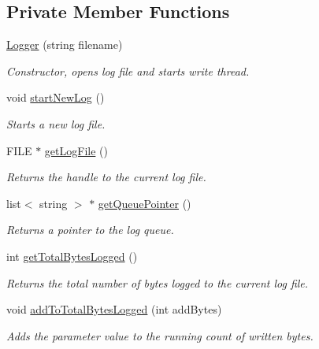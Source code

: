 \subsection*{Private Member Functions}
\begin{DoxyCompactItemize}
\item 
\hyperlink{class_logger_a08ccb1b46d6ffef44052d289ecb4b04b}{Logger} (string filename)
\begin{DoxyCompactList}\small\item\em Constructor, opens log file and starts write thread. \end{DoxyCompactList}\item 
void \hyperlink{class_logger_ad4a86aaac1a3ee4f20d17870d42c3bd7}{startNewLog} ()
\begin{DoxyCompactList}\small\item\em Starts a new log file. \end{DoxyCompactList}\item 
FILE $\ast$ \hyperlink{class_logger_a500fbb10633823816dddf2c02399bd12}{getLogFile} ()
\begin{DoxyCompactList}\small\item\em Returns the handle to the current log file. \end{DoxyCompactList}\item 
list$<$ string $>$ $\ast$ \hyperlink{class_logger_a8c61058413834c09b30308a6dee2254a}{getQueuePointer} ()
\begin{DoxyCompactList}\small\item\em Returns a pointer to the log queue. \end{DoxyCompactList}\item 
int \hyperlink{class_logger_a141ece1d87b15875dfdc08061e45c597}{getTotalBytesLogged} ()
\begin{DoxyCompactList}\small\item\em Returns the total number of bytes logged to the current log file. \end{DoxyCompactList}\item 
void \hyperlink{class_logger_a626bc2d1ba4cd32c6075a03ed6c9ee60}{addToTotalBytesLogged} (int addBytes)
\begin{DoxyCompactList}\small\item\em Adds the parameter value to the running count of written bytes. \end{DoxyCompactList}\end{DoxyCompactItemize}
